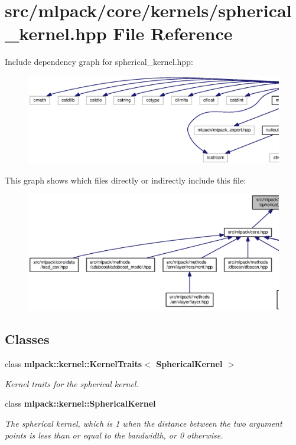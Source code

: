 \section{src/mlpack/core/kernels/spherical\+\_\+kernel.hpp File Reference}
\label{spherical__kernel_8hpp}
Include dependency graph for spherical\+\_\+kernel.\+hpp\+:
\nopagebreak
\begin{figure}[H]
\begin{center}
\leavevmode
\includegraphics[width=350pt]{spherical__kernel_8hpp__incl}
\end{center}
\end{figure}
This graph shows which files directly or indirectly include this file\+:
\nopagebreak
\begin{figure}[H]
\begin{center}
\leavevmode
\includegraphics[width=350pt]{spherical__kernel_8hpp__dep__incl}
\end{center}
\end{figure}
\subsection*{Classes}
\begin{DoxyCompactItemize}
\item 
class {\bf mlpack\+::kernel\+::\+Kernel\+Traits$<$ Spherical\+Kernel $>$}
\begin{DoxyCompactList}\small\item\em Kernel traits for the spherical kernel. \end{DoxyCompactList}\item 
class {\bf mlpack\+::kernel\+::\+Spherical\+Kernel}
\begin{DoxyCompactList}\small\item\em The spherical kernel, which is 1 when the distance between the two argument points is less than or equal to the bandwidth, or 0 otherwise. \end{DoxyCompactList}\end{DoxyCompactItemize}
